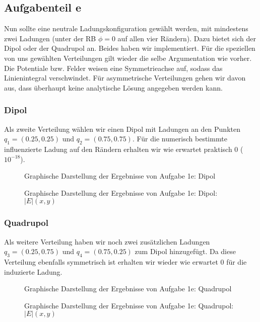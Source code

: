 \subsection*{Aufgabenteil e}
Nun sollte eine neutrale Ladungskonfiguration gewählt werden, mit mindestens zwei Ladungen (unter
der RB $\phi = 0$ auf allen vier Rändern). Dazu bietet sich der Dipol oder der Quadrupol an. Beides
haben wir implementiert. Für die speziellen von uns gewählten Verteilungen gilt wieder die selbe
Argumentation wie vorher. Die Potentiale bzw. Felder weisen eine Symmetrieachse auf, sodass das
Linienintegral verschwindet. Für asymmetrische Verteilungen gehen wir davon aus, dass überhaupt
keine analytische Lösung angegeben werden kann.

\subsubsection*{Dipol}
Als zweite Verteilung wählen wir einen Dipol mit Ladungen an den Punkten $q_1 = (0.25, 0.25)$ und
$q_2 = (0.75,0.75)$. Für die numerisch bestimmte influenzierte Ladung auf den Rändern erhalten wir
wie erwartet praktisch 0 ($10^{-18}$).

\begin{landscape}
	\begin{figure}
		\caption{Graphische Darstellung der Ergebnisse von Aufgabe 1e: Dipol}
		\label{fig:edipol}
	\end{figure}
\end{landscape}


\begin{landscape}
	\begin{figure}
		\caption{Graphische Darstellung der Ergebnisse von Aufgabe 1e: Dipol: $|E|(x,y)$}
		\label{fig:edipolabse}
	\end{figure}
\end{landscape}

\subsubsection*{Quadrupol}
Als weitere Verteilung haben wir noch zwei zusätzlichen Ladungen $q_3 = (0.25,0.75)$ und $q_4 =
(0.75,0.25)$ zum Dipol hinzugefügt. Da diese Verteilung ebenfalls symmetrisch ist erhalten wir
wieder wie erwartet 0 für die induzierte Ladung.

\begin{landscape}
	\begin{figure}
		\caption{Graphische Darstellung der Ergebnisse von Aufgabe 1e: Quadrupol}
		\label{fig:equad}
	\end{figure}
\end{landscape}

\begin{landscape}
	\begin{figure}
		\caption{Graphische Darstellung der Ergebnisse von Aufgabe 1e: Quadrupol: $|E|(x,y)$}
		\label{fig:equadabse}
	\end{figure}
\end{landscape}


